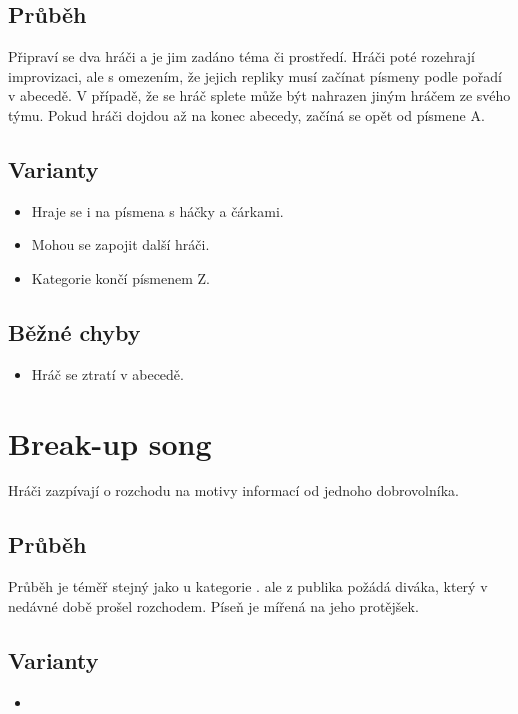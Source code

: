 \documentclass[main.tex]{subfiles}
\begin{document}
\subsection{Průběh} Připraví se dva hráči a je jim zadáno téma či prostředí. Hráči poté rozehrají improvizaci, ale s omezením, že jejich repliky musí začínat písmeny podle pořadí v abecedě. V případě, že se hráč splete může být nahrazen jiným hráčem ze svého týmu. Pokud hráči dojdou až na konec abecedy, začíná se opět od písmene A. 
 
\subsection{ Varianty } \begin{itemize}
\item  Hraje se i na písmena s háčky a čárkami.
\item  Mohou se zapojit další hráči.
\item  Kategorie končí písmenem Z.
\end{itemize}
 
\subsection{ Běžné chyby } \begin{itemize}
\item Hráč se ztratí v abecedě.
\end{itemize}
 
 
 
 
 
\needspace{5cm} \section{Break-up song} \label{break-up song}  
 
Hráči zazpívají o rozchodu na motivy informací od jednoho dobrovolníka. 
 
\subsection{ Průběh } Průběh je téměř stejný jako u kategorie .  ale z publika požádá diváka, který v nedávné době prošel rozchodem. Píseň je mířená na jeho protějšek. 
 
\subsection{ Varianty } \begin{itemize}
\item {}
\end{itemize}
 
\end{document}
